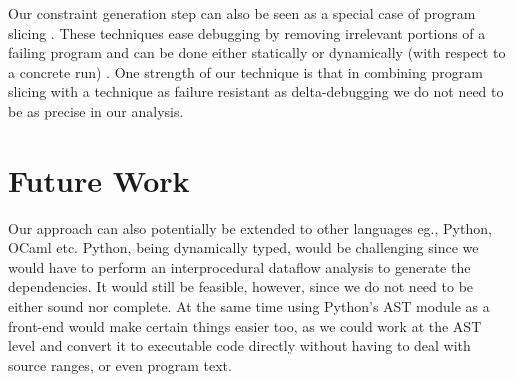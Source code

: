 \documentclass[11pt]{article}
\begin{document}
Our constraint generation step can also be seen as a special case of program
slicing \cite{weiser81} \cite{tip94}. These techniques ease debugging by
removing irrelevant portions of a failing program and can be done either
statically or dynamically (with respect to a concrete run) \cite{agrawal90}. One
strength of our technique is that in combining program slicing with a technique
as failure resistant as delta-debugging we do not need to be as precise in our
analysis.


\section{Future Work}
Our approach can also potentially be extended to other languages eg., Python,
OCaml etc. Python, being dynamically typed, would be challenging since we would
have to perform an interprocedural dataflow analysis to generate the
dependencies. It would still be feasible, however, since we do not need to be
either sound nor complete. At the same time using Python's AST module as a
front-end would make certain things easier too, as we could work at the AST
level and convert it to executable code directly without having to deal with
source ranges, or even program text.



\end{document}

